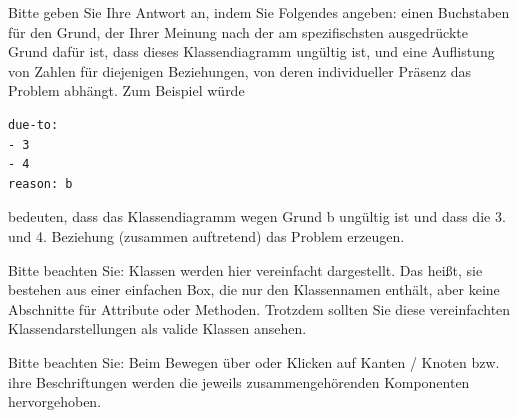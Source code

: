 Bitte geben Sie Ihre Antwort an, indem Sie Folgendes angeben: einen Buchstaben für den Grund, der Ihrer Meinung nach der am spezifischsten ausgedrückte Grund dafür ist, dass dieses Klassendiagramm ungültig ist, und eine Auflistung von Zahlen für diejenigen Beziehungen, von deren individueller Präsenz das Problem abhängt. Zum Beispiel würde


\begin{verbatim}
due-to:
- 3
- 4
reason: b

\end{verbatim}


bedeuten, dass das Klassendiagramm wegen Grund b ungültig ist und dass die 3. und 4. Beziehung (zusammen auftretend) das Problem erzeugen.



Bitte beachten Sie: Klassen werden hier vereinfacht dargestellt. 
 Das heißt, sie bestehen aus einer einfachen Box, die nur den Klassennamen enthält, aber keine Abschnitte für Attribute oder Methoden. 
 Trotzdem sollten Sie diese vereinfachten Klassendarstellungen als valide Klassen ansehen.

Bitte beachten Sie: Beim Bewegen über oder Klicken auf Kanten / Knoten bzw. ihre Beschriftungen werden die jeweils zusammengehörenden Komponenten hervorgehoben.

